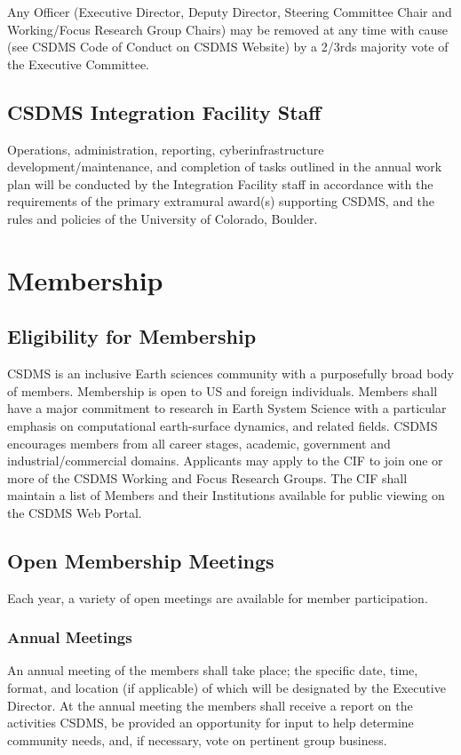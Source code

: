 \documentclass[11pt, oneside]{article}   	%
\def\article#1{
\renewcommand{\thesection}{Article \Roman{section}} 
\section[Article]{#1}
\renewcommand{\thesection}{\Roman{section}} 
}
\begin{document}
Any Officer (Executive Director, Deputy Director, Steering Committee Chair and Working/Focus Research Group Chairs) may be removed at any time with cause (see CSDMS Code of Conduct on CSDMS Website) by a 2/3rds majority vote of the Executive Committee.


\subsection{CSDMS Integration Facility Staff}

Operations, administration, reporting, cyberinfrastructure development/maintenance, and completion of tasks outlined in the annual work plan will be conducted by the Integration Facility staff in accordance with the requirements of the primary extramural award(s) supporting CSDMS, and the rules and policies of the University of Colorado, Boulder.


\article{Membership}


\subsection{Eligibility for Membership}

CSDMS is an inclusive Earth sciences community with a purposefully broad body of members. Membership is open to US and foreign individuals. Members shall have a major commitment to research in Earth System Science with a particular emphasis on computational earth-surface dynamics, and related fields. CSDMS encourages members from all career stages, academic, government and industrial/commercial domains. Applicants may apply to the CIF to join one or more of the CSDMS Working and Focus Research Groups. The CIF shall maintain a list of Members and their Institutions available for public viewing on the CSDMS Web Portal.


\subsection{Open Membership Meetings} Each year, a variety of open meetings are available for member participation.

\subsubsection{Annual Meetings} 

An annual meeting of the members shall take place; the specific date, time, format, and location (if applicable) of which will be designated by the Executive Director.  At the annual meeting the members shall receive a report on the activities CSDMS, be provided an opportunity for input to help determine community needs, and, if necessary, vote on pertinent group business.
\end{document}

